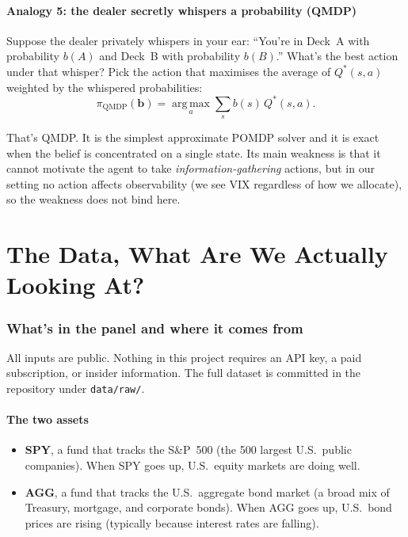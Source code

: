 \documentclass[11pt]{article}
\newcommand{\argmax}{\operatorname*{arg\,max}}
\newcommand{\bel}{\mathbf{b}}
\begin{document}
\subsection{Analogy 5: the dealer secretly whispers a probability (QMDP)}

\begin{analogy}
Suppose the dealer privately whispers in your ear: ``You're in Deck~A with probability $b(A)$ and Deck~B with probability $b(B)$.'' What's the best action under that whisper? Pick the action that maximises the average of $Q^*(s, a)$ weighted by the whispered probabilities:
\[
\pi_{\mathrm{QMDP}}(\bel) = \argmax_a \sum_s b(s)\, Q^*(s, a).
\]
\end{analogy}

That's QMDP. It is the simplest approximate POMDP solver and it is exact when the belief is concentrated on a single state. Its main weakness is that it cannot motivate the agent to take \emph{information-gathering} actions, but in our setting no action affects observability (we see VIX regardless of how we allocate), so the weakness does not bind here.

\part{The Data, What Are We Actually Looking At?}

\section{What's in the panel and where it comes from}

All inputs are public. Nothing in this project requires an API key, a paid subscription, or insider information. The full dataset is committed in the repository under \texttt{data/raw/}.

\subsection{The two assets}

\begin{itemize}
  \item \textbf{SPY}, a fund that tracks the S\&P~500 (the 500 largest U.S.\ public companies). When SPY goes up, U.S.\ equity markets are doing well.
  \item \textbf{AGG}, a fund that tracks the U.S.\ aggregate bond market (a broad mix of Treasury, mortgage, and corporate bonds). When AGG goes up, U.S.\ bond prices are rising (typically because interest rates are falling).
\end{itemize}
\end{document}
